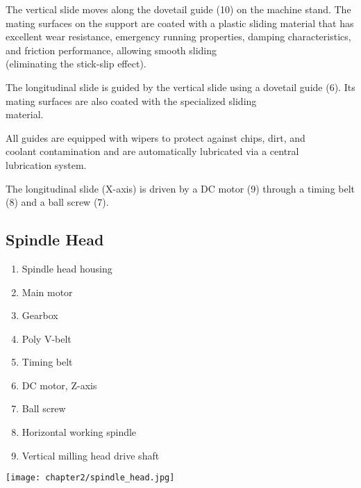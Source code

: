 \vspace{.3cm}

\noindent The vertical slide moves along the dovetail guide (10) on the machine stand. The mating surfaces on the support are coated with a plastic sliding material that has excellent wear resistance, emergency running properties, damping characteristics, and friction performance, allowing smooth sliding \\(eliminating the stick-slip effect).

\vspace{.3cm}

\noindent The longitudinal slide is guided by the vertical slide using a dovetail guide (6). Its mating surfaces are also coated with the specialized sliding \\material.

\vspace{.3cm}

\noindent All guides are equipped with wipers to protect against chips, dirt, and \\coolant contamination and are automatically lubricated via a central \\lubrication system.

\vspace{.3cm}

\noindent The longitudinal slide (X-axis) is driven by a DC motor (9) through a timing belt (8) and a ball screw (7).

\vfill
\clearpage

\subsection{Spindle Head}

\begin{minipage}{0.5\textwidth}
    \begin{enumerate}[itemsep=1pt,parsep=0pt]
        \item Spindle head housing
        \item Main motor
        \item Gearbox
        \item Poly V-belt
        \item Timing belt
        \item DC motor, Z-axis
        \item Ball screw
        \item Horizontal working spindle
        \item Vertical milling head drive shaft
    \end{enumerate}
\end{minipage}%
\begin{minipage}{0.5\textwidth}
    \centering
    \texttt{[image: chapter2/spindle\_head.jpg]}
    \label{fig:spindle_head}
\end{minipage}


